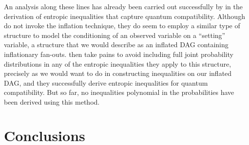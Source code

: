 An analysis along these lines has already been carried out successfully by \citet{Chaves2015infoquantum} in the derivation of entropic inequalities that capture quantum compatibility. Although \citet{Chaves2015infoquantum} do not invoke the inflation technique, they do seem to employ a similar type of structure to model the conditioning of an observed variable on a ``setting'' variable, a structure that we would describe as an inflated DAG containing inflationary fan-outs. \citet{Chaves2015infoquantum} then take pains to avoid including full joint probability distributions in any of the entropic inequalities they apply to this structure, %
precisely as we would want to do in constructing inequalities on our inflated DAG, and they successfully derive entropic inequalities for quantum compatibility. But so far, no inequalities polynomial in the probabilities have been derived using this method.







\section{Conclusions}


